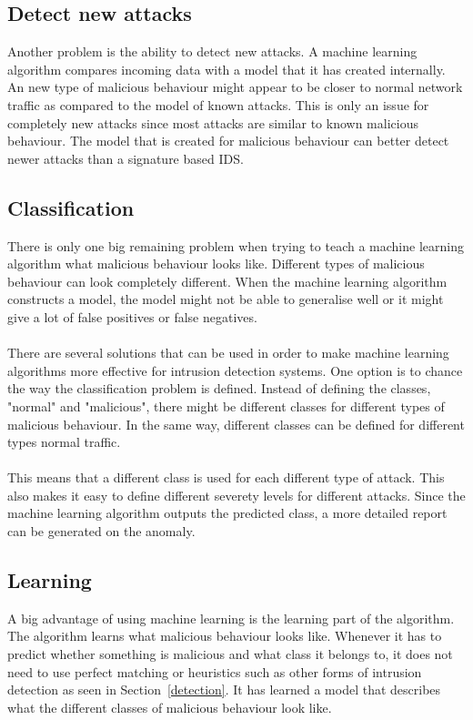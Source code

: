 \subsection{Detect new attacks}
Another problem is the ability to detect new attacks. A machine learning algorithm compares incoming data with a model that it has created internally. An new type of malicious behaviour might appear to be closer to normal network traffic as compared to the model of known attacks. This is only an issue for completely new attacks since most attacks are similar to known malicious behaviour. The model that is created for malicious behaviour can better detect newer attacks than a signature based IDS. \cite{ClosedWorld}

\subsection{Classification}
There is only one big remaining problem when trying to teach a machine learning algorithm what malicious behaviour looks like. Different types of malicious behaviour can look completely different. When the machine learning algorithm constructs a model, the model might not be able to generalise well or it might give a lot of false positives or false negatives. \\
\\
There are several solutions that can be used in order to make machine learning algorithms more effective for intrusion detection systems. One option is to chance the way the classification problem is defined. Instead of defining the classes, "normal" and "malicious", there might be different classes for different types of malicious behaviour. In the same way, different classes can be defined for different types normal traffic. \\
\\
This means that a different class is used for each different type of attack. This also makes it easy to define different severety levels for different attacks. Since the machine learning algorithm outputs the predicted class, a more detailed report can be generated on the anomaly. \cite{ClosedWorld}

\subsection{Learning}
A big advantage of using machine learning is the learning part of the algorithm. The algorithm learns what malicious behaviour looks like. Whenever it has to predict whether something is malicious and what class it belongs to, it does not need to use perfect matching or heuristics such as other forms of intrusion detection as seen in Section~\ref{detection}. It has learned a model that describes what the different classes of malicious behaviour look like. \cite{subaira2014efficient}

